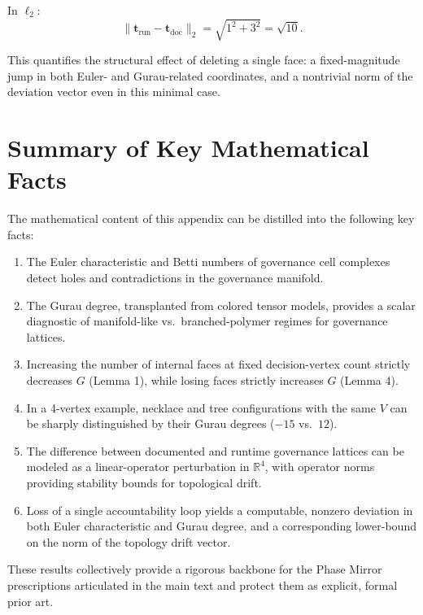 \documentclass[11pt]{article}
\begin{document}
In \(\ell_2\):
\[
\|\mathbf{t}_{\mathrm{run}} - \mathbf{t}_{\mathrm{doc}}\|_2 = \sqrt{1^2 + 3^2} = \sqrt{10}.
\]

This quantifies the structural effect of deleting a single face: a fixed-magnitude jump in both Euler- and Gurau-related coordinates, and a nontrivial norm of the deviation vector even in this minimal case.

\section{Summary of Key Mathematical Facts}

The mathematical content of this appendix can be distilled into the following key facts:

\begin{enumerate}
  \item The Euler characteristic and Betti numbers of governance cell complexes detect holes and contradictions in the governance manifold.
  \item The Gurau degree, transplanted from colored tensor models, provides a scalar diagnostic of manifold-like vs.\ branched-polymer regimes for governance lattices.
  \item Increasing the number of internal faces at fixed decision-vertex count strictly decreases \(G\) (Lemma 1), while losing faces strictly increases \(G\) (Lemma 4).
  \item In a 4-vertex example, necklace and tree configurations with the same \(V\) can be sharply distinguished by their Gurau degrees (\(-15\) vs.\ \(12\)).
  \item The difference between documented and runtime governance lattices can be modeled as a linear-operator perturbation in \(\mathbb{R}^4\), with operator norms providing stability bounds for topological drift.
  \item Loss of a single accountability loop yields a computable, nonzero deviation in both Euler characteristic and Gurau degree, and a corresponding lower-bound on the norm of the topology drift vector.
\end{enumerate}

These results collectively provide a rigorous backbone for the Phase Mirror prescriptions articulated in the main text and protect them as explicit, formal prior art.

\nocite{*}
  

\end{document}
